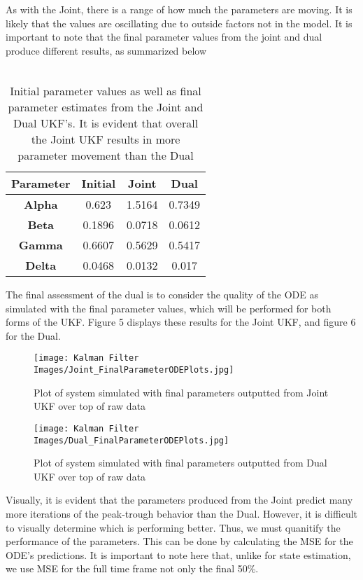 As with the Joint, there is a range of how much the parameters are moving. It is likely that the values are oscillating due to outside factors not in the model. It is important to note that the final parameter values from the joint and dual produce different results, as summarized below\\
\\
\begin{table}[H]
  \begin{center}
    \label{tab:table1}
    \begin{tabular}{c|c|c|c} %
      \textbf{Parameter} & \textbf{Initial} & \textbf{Joint} & \textbf{Dual} \\
      \hline
      \textbf{Alpha} & 0.623 & 1.5164 & 0.7349\\
      \textbf{Beta} & 0.1896 & 0.0718 & 0.0612\\
      \textbf{Gamma} & 0.6607 & 0.5629 & 0.5417\\
      \textbf{Delta} & 0.0468 & 0.0132 & 0.017
    \end{tabular}
    \caption{Initial parameter values as well as final parameter estimates from the Joint and Dual UKF's. It is evident that overall the Joint UKF results in more parameter movement than the Dual}
  \end{center}
\end{table}
The final assessment of the dual is to consider the quality of the ODE as simulated with the final parameter values, which will be performed for both forms of the UKF. Figure 5 displays these results for the Joint UKF, and figure 6 for the Dual. \\

\begin{figure}[H]
    \centering
    \texttt{[image: Kalman Filter Images/Joint\_FinalParameterODEPlots.jpg]}
    \caption{Plot of system simulated with final parameters outputted from Joint UKF over top of raw data}
\end{figure}

\begin{figure}[H]
    \centering
    \texttt{[image: Kalman Filter Images/Dual\_FinalParameterODEPlots.jpg]}
    \caption{Plot of system simulated with final parameters outputted from Dual UKF over top of raw data}
\end{figure}

Visually, it is evident that the parameters produced from the Joint predict many more iterations of the peak-trough behavior than the Dual. However, it is difficult to visually determine which is performing better. Thus, we must quanitify the performance of the parameters. This can be done by calculating the MSE for the ODE's predictions. It is important to note here that, unlike for state estimation, we use MSE for the full time frame not only the final 50\%.

